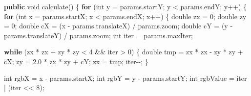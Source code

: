 \documentclass[11pt]{article}
\newenvironment{Shaded}{}{}
\newcommand{\KeywordTok}[1]{\textcolor[rgb]{0.00,0.44,0.13}{\textbf{{#1}}}}
\newcommand{\DataTypeTok}[1]{\textcolor[rgb]{0.56,0.13,0.00}{{#1}}}
\newcommand{\DecValTok}[1]{\textcolor[rgb]{0.25,0.63,0.44}{{#1}}}
\newcommand{\FloatTok}[1]{\textcolor[rgb]{0.25,0.63,0.44}{{#1}}}
\newcommand{\FunctionTok}[1]{\textcolor[rgb]{0.02,0.16,0.49}{{#1}}}
\newcommand{\NormalTok}[1]{{#1}}
\newcommand{\ControlFlowTok}[1]{\textcolor[rgb]{0.00,0.44,0.13}{\textbf{{#1}}}}
\newcommand{\OperatorTok}[1]{\textcolor[rgb]{0.40,0.40,0.40}{{#1}}}
\begin{document}
\begin{Shaded}
\begin{Highlighting}[]
    \KeywordTok{public} \DataTypeTok{void} \FunctionTok{calculate}\OperatorTok{()} \OperatorTok{\{}
        \ControlFlowTok{for} \OperatorTok{(}\DataTypeTok{int}\NormalTok{ y }\OperatorTok{=}\NormalTok{ params}\OperatorTok{.}\FunctionTok{startY}\OperatorTok{;}\NormalTok{ y }\OperatorTok{\textless{}}\NormalTok{ params}\OperatorTok{.}\FunctionTok{endY}\OperatorTok{;}\NormalTok{ y}\OperatorTok{++)} \OperatorTok{\{}
            \ControlFlowTok{for} \OperatorTok{(}\DataTypeTok{int}\NormalTok{ x }\OperatorTok{=}\NormalTok{ params}\OperatorTok{.}\FunctionTok{startX}\OperatorTok{;}\NormalTok{ x }\OperatorTok{\textless{}}\NormalTok{ params}\OperatorTok{.}\FunctionTok{endX}\OperatorTok{;}\NormalTok{ x}\OperatorTok{++)} \OperatorTok{\{}
                \DataTypeTok{double}\NormalTok{ zx }\OperatorTok{=} \DecValTok{0}\OperatorTok{;}
                \DataTypeTok{double}\NormalTok{ zy }\OperatorTok{=} \DecValTok{0}\OperatorTok{;}
                \DataTypeTok{double}\NormalTok{ cX }\OperatorTok{=} \OperatorTok{(}\NormalTok{x }\OperatorTok{{-}}\NormalTok{ params}\OperatorTok{.}\FunctionTok{translateX}\OperatorTok{)} \OperatorTok{/}\NormalTok{ params}\OperatorTok{.}\FunctionTok{zoom}\OperatorTok{;}
                \DataTypeTok{double}\NormalTok{ cY }\OperatorTok{=} \OperatorTok{(}\NormalTok{y }\OperatorTok{{-}}\NormalTok{ params}\OperatorTok{.}\FunctionTok{translateY}\OperatorTok{)} \OperatorTok{/}\NormalTok{ params}\OperatorTok{.}\FunctionTok{zoom}\OperatorTok{;}
                \DataTypeTok{int}\NormalTok{ iter }\OperatorTok{=}\NormalTok{ params}\OperatorTok{.}\FunctionTok{maxIter}\OperatorTok{;}

                \ControlFlowTok{while} \OperatorTok{(}\NormalTok{zx }\OperatorTok{*}\NormalTok{ zx }\OperatorTok{+}\NormalTok{ zy }\OperatorTok{*}\NormalTok{ zy }\OperatorTok{\textless{}} \DecValTok{4} \OperatorTok{\&\&}\NormalTok{ iter }\OperatorTok{\textgreater{}} \DecValTok{0}\OperatorTok{)} \OperatorTok{\{}
                    \DataTypeTok{double}\NormalTok{ tmp }\OperatorTok{=}\NormalTok{ zx }\OperatorTok{*}\NormalTok{ zx }\OperatorTok{{-}}\NormalTok{ zy }\OperatorTok{*}\NormalTok{ zy }\OperatorTok{+}\NormalTok{ cX}\OperatorTok{;}
\NormalTok{                    zy }\OperatorTok{=} \FloatTok{2.0} \OperatorTok{*}\NormalTok{ zx }\OperatorTok{*}\NormalTok{ zy }\OperatorTok{+}\NormalTok{ cY}\OperatorTok{;}
\NormalTok{                    zx }\OperatorTok{=}\NormalTok{ tmp}\OperatorTok{;}
\NormalTok{                    iter}\OperatorTok{{-}{-};}
                \OperatorTok{\}}

                \DataTypeTok{int}\NormalTok{ rgbX }\OperatorTok{=}\NormalTok{ x }\OperatorTok{{-}}\NormalTok{ params}\OperatorTok{.}\FunctionTok{startX}\OperatorTok{;}
                \DataTypeTok{int}\NormalTok{ rgbY }\OperatorTok{=}\NormalTok{ y }\OperatorTok{{-}}\NormalTok{ params}\OperatorTok{.}\FunctionTok{startY}\OperatorTok{;}
                \DataTypeTok{int}\NormalTok{ rgbValue }\OperatorTok{=}\NormalTok{ iter }\OperatorTok{|} \OperatorTok{(}\NormalTok{iter }\OperatorTok{\textless{}\textless{}} \DecValTok{8}\OperatorTok{);}


\end{Highlighting}
\end{Shaded}
\end{document}
